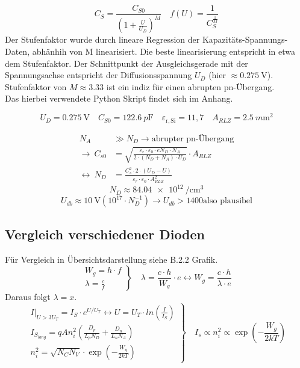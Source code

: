\documentclass[
	a4paper, %
	12pt, %
]{CSUniSchoolLabReport}
\newcommand{\pico}{p}
\newcommand{\milli}{m}
\begin{document}
\[
C_S = \frac{C_{S0}}{(1+\frac{U}{U_D})^M}\quad f(U) = \frac{1}{C_S^\frac{1}{M}}
\]
Der Stufenfaktor wurde durch lineare Regression der Kapazitäts-Spannungs-Daten, abhänhih von M linearisiert. Die beste linearisierung entspricht in etwa dem Stufenfaktor. 
Der Schnittpunkt der Ausgleichsgerade mit der Spannungsachse entspricht der Diffusionsspannung $U_D$ (hier $\approx \SI{0.275}{\volt}$).
Stufenfaktor von $M \approx 3.33$ ist ein indiz für einen abrupten pn-Übergang. \\
Das hierbei verwendete Python Skript findet sich im Anhang.



\[
U_D = \SI{0.275}{\volt} \quad C_{S0} = \SI{122,6}{\pico\farad} \quad \varepsilon_{\mathrm{r,Si}} = 11{,}7 \quad A_{RLZ} = \SI{2.5}{\milli\metre\squared}
\]

\begin{align*}
N_A &\gg N_D \rightarrow \text{abrupter pn-Übergang} \\
\rightarrow\ C_{s0} &= \sqrt{\frac{\varepsilon_r \cdot \varepsilon_0 \cdot e N_D \cdot N_A}{2 \cdot (N_D + N_A) \cdot U_D}} \cdot A_{RLZ} \\
\leftrightarrow\ N_D &= \frac{C_s^2 \cdot 2 \cdot (U_D - U)}{\varepsilon_r \cdot \varepsilon_0 \cdot A_{RLZ}^2}
\end{align*}
\[
N_D \approx \SI{84.04e12}{\per\centi\meter\cubed}
\]
\vspace{1em} 
\[
	U_{db} \approx \SI{10}{\volt}(10^{17} \cdot N_D^{-1}) \rightarrow U_{db} > 1400 \text{also plausibel}
\]
\subsection{Vergleich verschiedener Dioden}
Für Vergleich in Übersichtsdarstellung siehe B.2.2 Grafik.
\[
\left.
\begin{array}{l}
W_g = h \cdot f \\
\lambda = \frac{c}{f}
\end{array}
\right\}
\quad \lambda = \frac{c\cdot h}{W_g} \cdot e \leftrightarrow W_g = \frac{c \cdot h}{\lambda \cdot e}
\]
Daraus folgt $\lambda = x$. \\

\[
\left.
\begin{array}{l}
I|_{U>3U_T} = I_S\cdot e^{U/U_T} \leftrightarrow U = U_T\cdot ln(\frac{I}{I_S}) \\
I_{S_{lang}} = q A n_i^2 \left( \frac{D_p}{L_p N_D} + \frac{D_n}{L_n N_A} \right) \\
n_i^2 = \sqrt{N_C N_V} \cdot \exp\left(-\frac{W_g}{2kT}\right)
\end{array}
\right\}
\quad I_s \varpropto n_i^2 \varpropto \exp\left(-\frac{W_g}{2kT}\right)
\]
\end{document}
